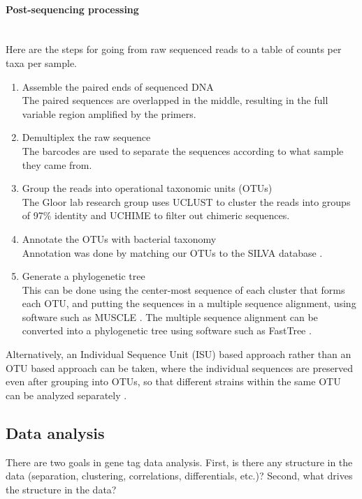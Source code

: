 \paragraph{Post-sequencing processing}\mbox{}\\
Here are the steps for going from raw sequenced reads to a table of counts per taxa per sample.
\begin{enumerate}
\item Assemble the paired ends of sequenced DNA\\
The paired sequences are overlapped in the middle, resulting in the full variable region amplified by the primers.

\item Demultiplex the raw sequence\\
The barcodes are used to separate the sequences according to what sample they came from.

\item Group the reads into operational taxonomic units (OTUs)\\
The Gloor lab research group uses UCLUST \cite{edgar2010search} to cluster the reads into groups of 97\% identity and UCHIME \cite{edgar2011uchime} to filter out chimeric sequences.

\item Annotate the OTUs with bacterial taxonomy\\
Annotation was done by  matching our OTUs to the SILVA database \cite{quast2013silva}.

\item Generate a phylogenetic tree\\
This can be done using the center-most sequence of each cluster that forms each OTU, and putting the sequences in a multiple sequence alignment, using software such as MUSCLE \cite{edgar2004muscle}. The multiple sequence alignment can be converted into a phylogenetic tree using software such as FastTree \cite{price2010fasttree}.
\end{enumerate}

Alternatively, an Individual Sequence Unit (ISU) based approach rather than an OTU based approach can be taken, where the individual sequences are preserved even after grouping into OTUs, so that different strains within the same OTU can be analyzed separately \cite{callahan2015dada2}.

\FloatBarrier

\subsection{Data analysis}
There are two goals in gene tag data analysis. First, is there any structure in the data (separation, clustering, correlations, differentials, etc.)? Second, what drives the structure in the data?

